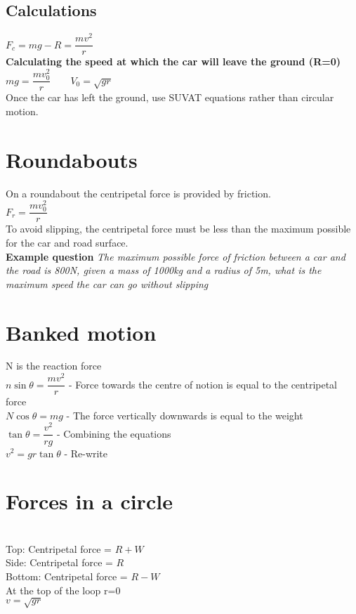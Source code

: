 \documentclass{article}[18pt]
\begin{document}
\subsection{Calculations}
$F_c=mg-R=\dfrac{mv^2}{r}$\\
\textbf{Calculating the speed at which the car will leave the ground (R=0)}\\
$mg=\dfrac{mv_0^2}{r} \qquad V_0=\sqrt{gr}$\\
Once the car has left the ground, use SUVAT equations rather than circular motion.
\section{Roundabouts}
On a roundabout the centripetal force is provided by friction.\\
$F_r=\dfrac{mv_0^2}{r}$\\
To avoid slipping, the centripetal force must be less than the maximum possible for the car and road surface.\\
\textbf{Example question}
\textit{The maximum possible force of friction between a car and the road is 800N, given a mass of 1000kg and a radius of 5m, what is the maximum speed the car can go without slipping}
\newpage
\section{Banked motion}
N is the reaction force\\
$n\sin\theta=\dfrac{mv^2}{r}$ - Force towards the centre of notion is equal to the centripetal force\\
$N\cos\theta=mg$ - The force vertically downwards is equal to the weight\\
$\tan\theta=\dfrac{v^2}{rg}$ - Combining the equations\\
$v^2=gr\tan\theta$ - Re-write
\section{Forces in a circle}
\\
Top: Centripetal force = $R+W$\\
Side: Centripetal force = $R$\\
Bottom: Centripetal force = $R-W$\\
At the top of the loop r=0\\
$v=\sqrt{gr}$
\end{document}
